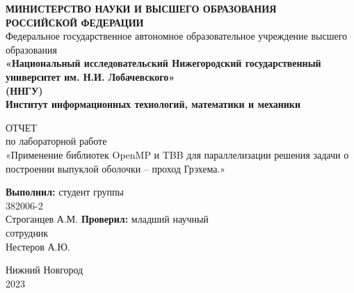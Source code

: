 \documentclass[14pt, a4paper]{extarticle}
\title{}
\author{}
\date{}
\begin{document}
  \begin{titlepage}
    \begin{center}
      {\bfseries МИНИСТЕРСТВО НАУКИ И ВЫСШЕГО ОБРАЗОВАНИЯ \\
        РОССИЙСКОЙ ФЕДЕРАЦИИ}
      \\
      Федеральное государственное автономное образовательное учреждение высшего образования
      \\
      {\bfseries «Национальный исследовательский Нижегородский государственный университет им. Н.И. Лобачевского»\\(ННГУ)
        \\Институт информационных технологий, математики и механики} \\
    \end{center}

    \vspace{8em}

    \begin{center}
      ОТЧЕТ \\ по лабораторной работе \\
      «Применение библиотек OpenMP и TBB для параллелизации решения задачи о построении выпуклой оболочки – проход Грэхема.»
    \end{center}

    \vspace{5em}


    \begin{flushright}
      {\bfseries Выполнил:} студент группы\\382006-2\\Строганцев А.М. \underline{\hspace{3cm}} \linebreak\linebreak\linebreak
      {\bfseries Проверил:} младший научный\\сотрудник\\Нестеров А.Ю. \underline{\hspace{3cm}} 
    \end{flushright}


    \vspace{\fill}

    \begin{center}
      Нижний Новгород\\2023
    \end{center}

  \end{titlepage}
\end{document}
